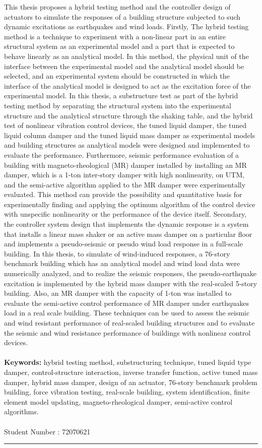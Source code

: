 This thesis proposes a hybrid testing method and the controller design of actuators to simulate the responses of a building structure subjected to such dynamic excitations as earthquakes and wind loads. Firstly, The hybrid testing method is a technique to experiment with a non-linear part in an entire structural system as an experimental model and a part that is expected to behave linearly as an analytical model. In this method, the physical unit of the interface between the experimental model and the analytical model should be selected, and an experimental system should be constructed in which the interface of the analytical model is designed to act as the excitation force of the experimental model. In this thesis, a substructure test as part of the hybrid testing method by separating the structural system into the experimental structure and the analytical structure through the shaking table, and the hybrid test of nonlinear vibration control devices, the tuned liquid damper, the tuned liquid column damper and the tuned liquid mass damper as experimental models and building structures as analytical models were designed and implemented to evaluate the performance. Furthermore, seismic performance evaluation of a building with magneto-rheological (MR) damper installed by installing an MR damper, which is a 1-ton inter-story damper with high nonlinearity, on UTM, and the semi-active algorithm applied to the MR damper were experimentally evaluated. This method can provide the possibility and quantitative basis for experimentally finding and applying the optimum algorithm of the control device with unspecific nonlinearity or the performance of the device itself. Secondary, the controller system design that implements the dynamic response is a system that installs a linear mass shaker or an active mass damper on a particular floor and implements a pseudo-seismic or pseudo wind load response in a full-scale building. In this thesis, to simulate of wind-induced responses, a 76-story benchmark building which has an analytical model and wind load data were numerically analyzed, and to realize the seismic responses, the pseudo-earthquake excitation is implemented by the hybrid mass damper with the real-scaled 5-story building. Also, an MR damper with the capacity of 1-ton was installed to evaluate the semi-active control performance of MR damper under earthquakes load in a real scale building. These techniques can be used to assess the seismic and wind resistant performance of real-scaled building structures and to evaluate the seismic and wind resistance performance of buildings with nonlinear control devices.
\\
\\
{\large\textbf{Keywords:}}
hybrid testing method, substructuring technique, tuned liquid type damper, control-structure interaction, inverse transfer function, active tuned mass damper, hybrid mass damper, design of an actuator, 76-story benchmark problem building, force vibration testing, real-scale building, system identification, finite element model updating, magneto-rheological damper, semi-active control algorithms.
\\
\\
Student Number : 72070621\\
\noindent\rule[2pt]{\textwidth}{0.5pt}
